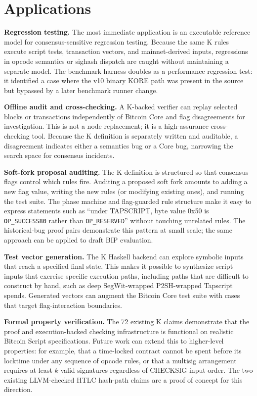 \documentclass[conference]{IEEEtran}
\begin{document}
\section{Applications}

\textbf{Regression testing.}
The most immediate application is an executable reference model for
consensus-sensitive regression testing.  Because the same K rules execute
script tests, transaction vectors, and mainnet-derived inputs, regressions in
opcode semantics or sighash dispatch are caught without maintaining a separate
model.  The benchmark harness doubles as a performance regression test: it
identified a case where the v10 binary KORE path was present in the source but
bypassed by a later benchmark runner change.

\textbf{Offline audit and cross-checking.}
A K-backed verifier can replay selected blocks or transactions independently of
Bitcoin Core and flag disagreements for investigation.  This is not a node
replacement; it is a high-assurance cross-checking tool.  Because the K
definition is separately written and auditable, a disagreement indicates either
a semantics bug or a Core bug, narrowing the search space for consensus
incidents.

\textbf{Soft-fork proposal auditing.}
The K definition is structured so that consensus flags control which rules fire.
Auditing a proposed soft fork amounts to adding a new flag value, writing the
new rules (or modifying existing ones), and running the test suite.  The phase
machine and flag-guarded rule structure make it easy to express statements such
as ``under TAPSCRIPT, byte value 0x50 is \texttt{OP\_SUCCESS80} rather than
\texttt{OP\_RESERVED}'' without touching unrelated rules.  The historical-bug
proof pairs demonstrate this pattern at small scale; the same approach can be
applied to draft BIP evaluation.

\textbf{Test vector generation.}
The K Haskell backend can explore symbolic inputs that reach a specified final
state.  This makes it possible to synthesize script inputs that exercise
specific execution paths, including paths that are difficult to construct by
hand, such as deep SegWit-wrapped P2SH-wrapped Tapscript spends.  Generated
vectors can augment the Bitcoin Core test suite with cases that target
flag-interaction boundaries.

\textbf{Formal property verification.}
The 72 existing K claims demonstrate that the proof and execution-backed
checking infrastructure is functional on realistic Bitcoin Script
specifications.  Future work can extend this to higher-level properties: for
example, that a time-locked contract
cannot be spent before its locktime under any sequence of opcode rules, or that
a multisig arrangement requires at least $k$ valid signatures regardless of
CHECKSIG input order.  The two existing LLVM-checked HTLC hash-path claims are
a proof of concept for this direction.
\end{document}
